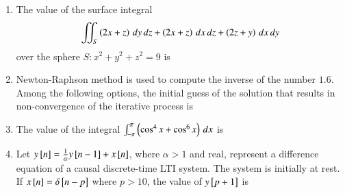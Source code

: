 \documentclass[journal,12pt,onecolumn]{IEEEtran}
\theoremstyle{remark}
\begin{document}
\begin{enumerate}
\item The value of the surface integral 
$$\iint_S \left(2x+z\right)\,dy\,dz + \left(2x+z\right)\,dx\,dz + \left(2z+y\right)\,dx\,dy$$
over the sphere $S \colon x^2 + y^2 + z^2 = 9$ is \par\hfill{}
\begin{enumerate}
\end{enumerate}


\item Newton-Raphson method is used to compute the inverse of the number $1.6$. Among the following options, the initial guess of the solution that results in non-convergence of the iterative process is \par\hfill{}
\begin{enumerate}
\end{enumerate}


\item The value of the integral
$\int_{-\pi}^{\pi} \left(\cos^4 x + \cos^6 x\right)\,dx$
is \par\hfill{}
\begin{enumerate}
\end{enumerate}


\item Let $y{}\left[n\right] = \frac{1}{\alpha} y{}\left[n-1\right] + x{}\left[n\right]$, where $\alpha > 1$ and real, represent a difference equation of a causal discrete-time LTI system. The system is initially at rest. If $x{}\left[n\right]= \delta{}\left[n-p\right]$ where $p>10$, the value of $y{}\left[p+1\right]$ is \par\hfill{}
\begin{enumerate}
\end{enumerate}



\end{enumerate}
\end{document}
